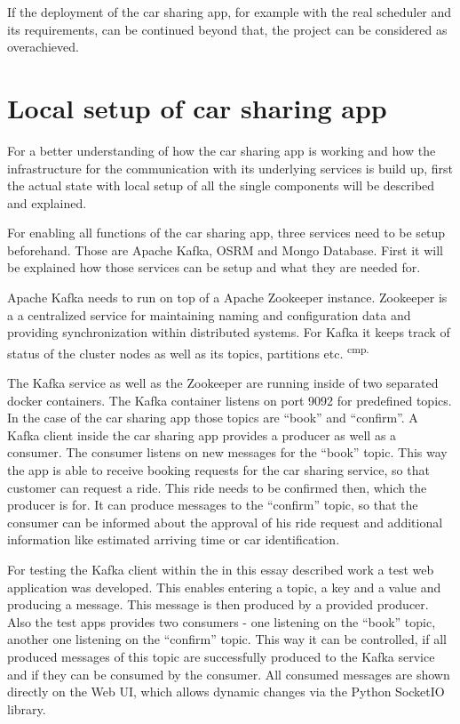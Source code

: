 If the deployment of the car sharing app, for example with the real scheduler and its requirements, can be continued beyond that, the project can be considered as overachieved.

\section{Local setup of car sharing app}

For a better understanding of how the car sharing app is working and how the infrastructure for the communication with its underlying services is build up, first the actual state with local setup of all the single components will be described and explained.

For enabling all functions of the car sharing app, three services need to be setup beforehand. Those are Apache Kafka, OSRM and Mongo Database. First it will be explained how those services can be setup and what they are needed for.

Apache Kafka needs to run on top of a Apache Zookeeper instance. Zookeeper is a a centralized service for maintaining naming and configuration data and providing synchronization within distributed systems. For Kafka it keeps track of status of the cluster nodes as well as its topics, partitions etc. \textsuperscript{cmp.\cite{38}}


The Kafka service as well as the Zookeeper are running inside of two separated docker containers. The Kafka container listens on port 9092 for predefined topics. In the case of the car sharing app those topics are ``book'' and ``confirm''. A Kafka client inside the car sharing app provides a producer as well as a consumer. The consumer listens on new messages for the ``book'' topic. This way the app is able to receive booking requests for the car sharing service, so that customer can request a ride. This ride needs to be confirmed then, which the producer is for. It can produce messages to the ``confirm'' topic, so that the consumer can be informed about the approval of his ride request and additional information like estimated arriving time or car identification.

For testing the Kafka client within the in this essay described work a test web application was developed. This enables entering a topic, a key and a value and producing a message. This message is then produced by a provided producer.  Also the test apps provides two consumers - one listening on the ``book'' topic, another one listening on the ``confirm'' topic. This way it can be controlled, if all produced messages of this topic are successfully produced to the Kafka service and if they can be consumed by the consumer. All consumed messages are shown directly on the Web UI, which allows dynamic changes via the Python SocketIO library.

